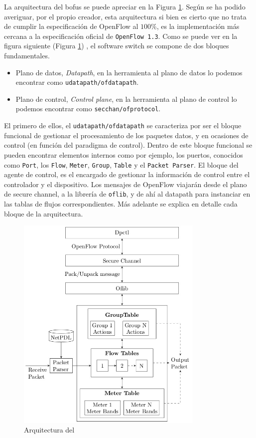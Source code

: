 La arquitectura del \gls{bofus} se puede apreciar en la Figura \ref{fig:bofuss2}. Según se ha podido averiguar, por el propio creador, esta arquitectura si bien es cierto que no trata de cumplir la especificación de OpenFlow al $100\%$, es la implementación más cercana a la especificación oficial de \texttt{OpenFlow 1.3}. Como se puede ver en la figura siguiente (Figura \ref{fig:bofuss2}) , el software switch se compone de dos bloques fundamentales.

\begin{itemize}
    \item   Plano de datos, \textit{Datapath}, en la herramienta al plano de datos lo podemos encontrar como \texttt{udatapath/ofdatapath}.
    \item   Plano de control, \textit{Control plane}, en la herramienta al plano de control lo podemos encontrar como \texttt{secchan/ofprotocol}.
\end{itemize}

El primero de ellos, el \texttt{udatapath/ofdatapath} se caracteriza por ser el bloque funcional de gestionar el procesamiento de los paquetes datos, y en ocasiones de control (en función del paradigma de control). Dentro de este bloque funcional se pueden encontrar elementos internos como por ejemplo, los puertos, conocidos como \texttt{Port}, los \texttt{Flow}, \texttt{Meter}, \texttt{Group}, \texttt{Table} y el \texttt{Packet Parser}. El bloque del agente de control, es el encargado de gestionar la información de control entre el controlador y el dispositivo. Los mensajes de OpenFlow viajarán desde el plano de secure channel, a la librería de \texttt{oflib}, y de ahí al datapath para instanciar en las tablas de flujos correspondientes. Más adelante se explica en detalle cada bloque de la arquitectura.

\begin{figure}[ht]
    \centering
    \includegraphics[width=0.8\textwidth]{archivos/img/teoria/bofuss2.png}
    \caption{Arquitectura del  \cite{fernandes2015software}}
    \label{fig:bofuss2}
\end{figure}

